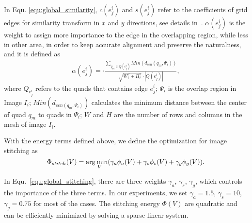 \documentclass[10pt,journal,compsoc]{IEEEtran}
\begin{document}
In Equ. \ref{equ:global_similarity}, $c(e^i_j)$ and $s(e^i_j)$ refer to the coefficients of  grid edges for similarity transform in $x$ and $y$ directions, see details in~\cite{journals/jgtools/IgarashiI09}. $\alpha(e^i_j)$ is the weight to assign more importance to the edge in the overlapping region, while less in other area, in order to keep accurate alignment and preserve the naturalness, and it is defined as
\begin{equation} \label{equ:global_weight}
\begin{split}
    \alpha(e^i_j)= \cdot \frac{\sum\limits_{q_m\in Q(e^i_j)}Min(d_{cen}(q_m, \Psi_i))}{\sqrt {W_i^2+H_i^2}\cdot |Q(e^i_j)|},
\end{split}
\end{equation}
where $Q_{e^i_j}$ refers to the quads that contains edge $e^i_j$;
$\Psi_i$ is the overlap region in Image $I_i$;
$Min(d_{cen(q_m, \Psi_i)})$ calculates the minimum distance between the center of quad $q_m$ to quads in $\Psi_i$;
$W$ and $H$ are the number of rows and columns in the mesh of image $I_i$.

With the energy terms defined above, we define the optimization for image stitching as
\begin{equation} \label{equ:global_stitching}
 \Phi_{stitch}(V)=\arg \min_{\hspace{-0.10in}V}(\gamma_a \phi_a(V)+\gamma_s \phi_s(V)+\gamma_g \phi_g(V)).
\end{equation}

In Equ.~\ref{equ:global_stitching}, there are three weights $\gamma_a$, $\gamma_s$, $\gamma_g$, which controls the importance of the three terms. In our experiments, we set $\gamma_a=1.5$, $\gamma_s=10$, $\gamma_g=0.75$ for most of the cases. The stitching energy $\Phi(V)$ are quadratic and can be efficiently minimized by solving a sparse linear system.
\end{document}
